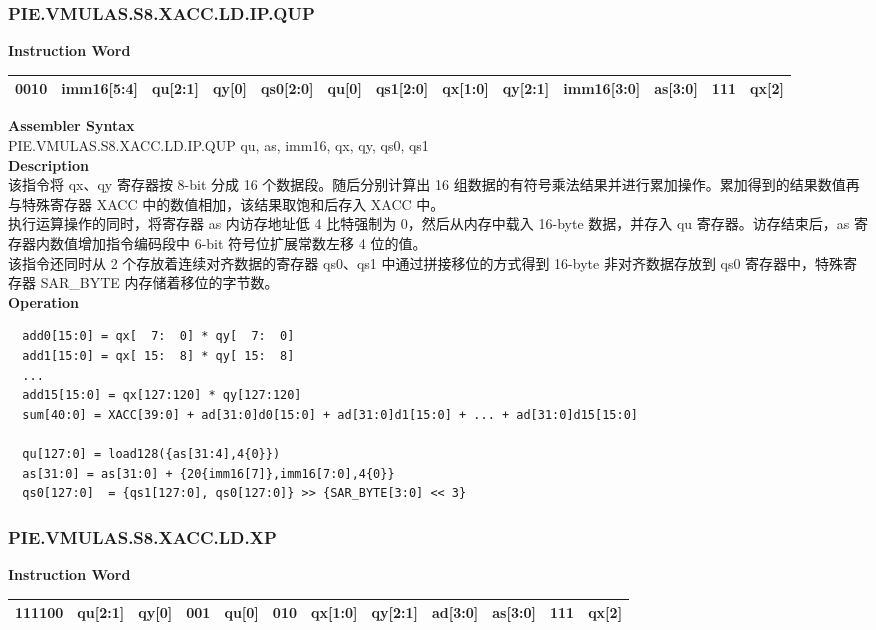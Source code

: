 \newpage
\subsubsection{PIE.VMULAS.S8.XACC.LD.IP.QUP}\label{instruction:PIEVMULASS8XACCLDIPQUP}
\setlength\tabcolsep{5pt}
\textbf{Instruction Word} \\
\begin{tabular}{|c|c|c|c|c|c|c|c|c|c|c|c|c|}
	\hline
	0010 & imm16[5:4] & qu[2:1] & qy[0] & qs0[2:0] & qu[0] & qs1[2:0] & qx[1:0] & qy[2:1] & imm16[3:0] & as[3:0] & 111 & qx[2] \\
	\hline
\end{tabular}

\textbf{Assembler Syntax} \\
PIE.VMULAS.S8.XACC.LD.IP.QUP qu, as, imm16, qx, qy, qs0, qs1 \\
\textbf{Description} \\
该指令将 qx、qy 寄存器按 8-bit 分成 16 个数据段。随后分别计算出 16 组数据的有符号乘法结果并进行累加操作。累加得到的结果数值再与特殊寄存器 XACC 中的数值相加，该结果取饱和后存入 XACC 中。\\
执行运算操作的同时，将寄存器 as 内访存地址低 4 比特强制为 0，然后从内存中载入 16-byte 数据，并存入 qu 寄存器。访存结束后，as 寄存器内数值增加指令编码段中 6-bit 符号位扩展常数左移 4 位的值。\\
该指令还同时从 2 个存放着连续对齐数据的寄存器 qs0、qs1 中通过拼接移位的方式得到 16-byte 非对齐数据存放到 qs0 寄存器中，特殊寄存器 SAR\_BYTE 内存储着移位的字节数。\\
\textbf{Operation}
\begin{lstlisting}
  add0[15:0] = qx[  7:  0] * qy[  7:  0]
  add1[15:0] = qx[ 15:  8] * qy[ 15:  8]
  ...
  add15[15:0] = qx[127:120] * qy[127:120]
  sum[40:0] = XACC[39:0] + ad[31:0]d0[15:0] + ad[31:0]d1[15:0] + ... + ad[31:0]d15[15:0]

  qu[127:0] = load128({as[31:4],4{0}})
  as[31:0] = as[31:0] + {20{imm16[7]},imm16[7:0],4{0}}
  qs0[127:0]  = {qs1[127:0], qs0[127:0]} >> {SAR_BYTE[3:0] << 3}
\end{lstlisting}

\newpage
\subsubsection{PIE.VMULAS.S8.XACC.LD.XP}\label{instruction:PIEVMULASS8XACCLDXP}
\setlength\tabcolsep{6pt}
\textbf{Instruction Word} \\
\begin{tabular}{|c|c|c|c|c|c|c|c|c|c|c|c|}
	\hline
	111100 & qu[2:1] & qy[0] & 001 & qu[0] & 010 & qx[1:0] & qy[2:1] & ad[3:0] & as[3:0] & 111 & qx[2] \\
	\hline
\end{tabular}

